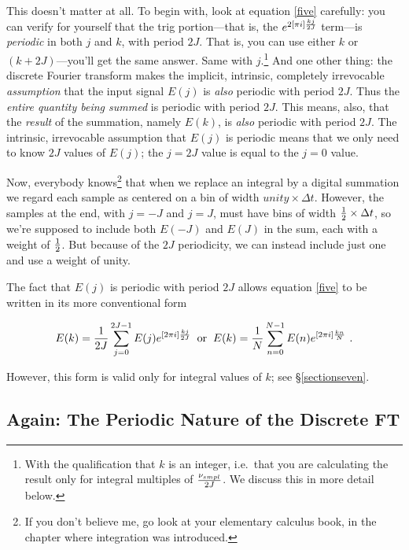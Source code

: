 \documentclass[11pt,preprint]{aastex}
\begin{document}
	This doesn't matter at all.  To begin with, look at equation
\ref{five} carefully: you can verify for yourself that the trig
portion---that is, the $e^{2[\pi i] {kj \over 2J}}$ term---is {\it
periodic} in both $j$ and $k$, with period $2J$.  That is, you can use
either $k$ or $(k + 2J)$---you'll get the same answer.  Same with
$j$.\footnote{With the qualification that $k$ is an integer, i.e.\ that
you are calculating the result only for integral multiples of
$\nu_{smpl} \over 2J$. We discuss this in more detail below.}  And one
other thing: the discrete Fourier transform makes the implicit,
intrinsic, completely irrevocable {\it assumption} that the input signal
$E(j)$ is {\it also} periodic with period $2J$.  Thus the {\it entire
quantity being summed} is periodic with period $2J$.  This means, also,
that the {\it result} of the summation, namely $E(k)$, is {\it also}
periodic with period $2J$. The intrinsic, irrevocable assumption that
$E(j)$ is periodic means that we only need to know $2J$ values of
$E(j)$; the $j = 2J$ value is equal to the $j=0$ value.  

	Now, everybody knows\footnote{If you don't believe me, go look
at your elementary calculus book, in the chapter where integration was
introduced.} that when we replace an integral by a digital summation we
regard each sample as centered on a bin of width $unity \times \Delta
t$.  However, the samples at the end, with $j=-J$ and $j=J$, must have
bins of width ${1 \over 2} \times \Delta t$, so we're supposed to
include both $E(-J)$ and $E(J)$ in the sum, each with a weight of $1
\over 2$.  But because of the $2J$ periodicity, we can instead include
just one and use a weight of unity. 

	The fact that $E(j)$ is periodic with period $2J$ allows
equation \ref{five} to be written in its more conventional form

\begin{equation} \label{eqnconventional}
E(k) = {1 \over 2J} \sum_{j=0}^{2J-1} E(j) e^{[2\pi i]
{kj \over 2J}} \; \; {\rm or} \; \;
E(k) = {1 \over N} \sum_{n=0}^{N-1} E(n) e^{[2\pi i]
{kn \over N}} \ .  \end{equation}

\noindent However, this form is valid only for integral values of $k$;
see \S \ref{sectionseven}. 

\subsection{ Again: The Periodic Nature of the Discrete FT}
\end{document}
